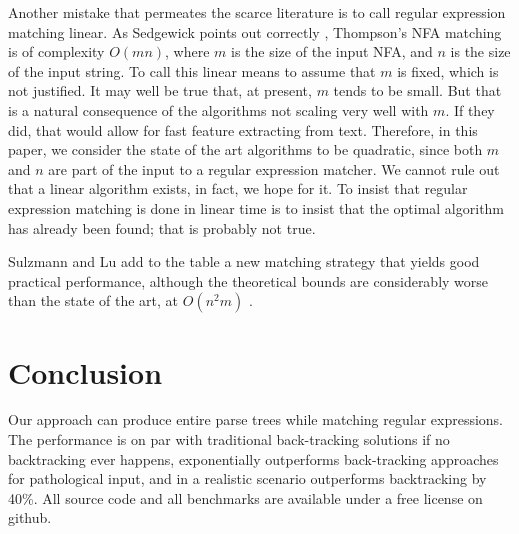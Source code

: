 \documentclass[english]{sigplanconf}
\theoremstyle{definition}
\begin{document}
Another mistake that permeates the scarce literature is to call regular
expression matching linear. As Sedgewick points out correctly \cite{Sedg90a},
Thompson's NFA matching is of complexity $O(mn)$, where $m$ is the
size of the input NFA, and $n$ is the size of the input string. To
call this linear means to assume that $m$ is fixed, which is not justified. It may well be true that, at present,
$m$ tends to be small. But that is a natural consequence of the algorithms
not scaling very well with $m$. If they did, that would allow for
fast feature extracting from text. Therefore, in this paper, we consider
the state of the art algorithms to be quadratic, since both $m$ and
$n$ are part of the input to a regular expression matcher. We cannot
rule out that a linear algorithm exists, in fact, we hope for it.
To insist that regular expression matching is done in linear time
is to insist that the optimal algorithm has already been found; that
is probably not true.

Sulzmann and Lu add to the table a new matching strategy that yields
good practical performance, although the theoretical bounds are considerably
worse than the state of the art, at $O(n^{2}m)$ \cite{Sulz12a}.

\section{Conclusion}
Our approach can produce entire parse trees while matching regular
expressions.  The performance is on par with traditional back-tracking
solutions if no backtracking ever happens, exponentially outperforms
back-tracking approaches for pathological input, and in a realistic
scenario outperforms backtracking by 40\%.  All source code and all
benchmarks are available under a free license on github.



\end{document}
